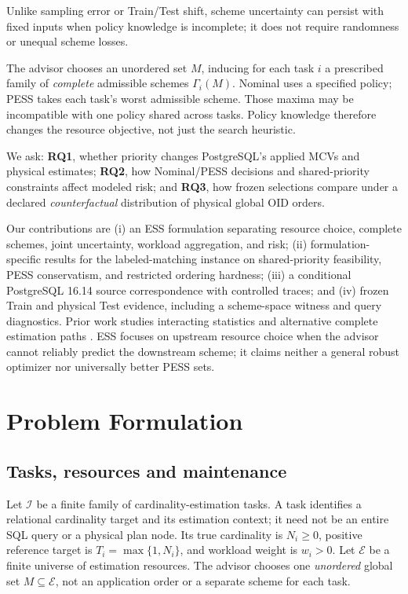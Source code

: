 \documentclass[sigconf, nonacm]{acmart}
\newcommand{\E}{\mathcal E}
\newcommand{\Tasks}{\mathcal I}
\begin{document}
Unlike sampling error or Train/Test shift, scheme uncertainty can
persist with fixed inputs when policy knowledge is incomplete; it
does not require randomness or unequal scheme losses.

The advisor chooses an unordered set \(M\), inducing for each task
\(i\) a prescribed family of \emph{complete} admissible schemes
\(\Gamma_i(M)\). Nominal uses a specified policy; PESS takes each
task's worst admissible scheme. Those maxima may be incompatible
with one policy shared across tasks. Policy knowledge therefore
changes the resource objective, not just the search heuristic.

We ask: \textbf{RQ1}, whether priority changes PostgreSQL's applied
MCVs and physical estimates; \textbf{RQ2}, how Nominal/PESS decisions
and shared-priority constraints affect modeled risk; and
\textbf{RQ3}, how frozen selections compare under a declared
\emph{counterfactual} distribution of physical global OID orders.

Our contributions are (i) an ESS formulation separating resource
choice, complete schemes, joint uncertainty, workload aggregation,
and risk; (ii) formulation-specific results for the labeled-matching
instance on shared-priority feasibility, PESS conservatism, and
restricted ordering hardness; (iii) a conditional PostgreSQL 16.14
source correspondence with controlled traces; and (iv) frozen Train
and physical Test evidence, including a scheme-space witness and
query diagnostics.
Prior work studies interacting statistics and alternative complete
estimation paths \cite{bruno2004conditional,chen2022ceg,elhelw2009statadvisor}.
ESS focuses on upstream resource choice when the advisor cannot
reliably predict the downstream scheme; it claims neither a general
robust optimizer nor universally better PESS sets.

\section{Problem Formulation}
\label{sec:model}

\subsection{Tasks, resources and maintenance}
Let \(\Tasks\) be a finite family of cardinality-estimation tasks.
A task identifies a relational cardinality target and its estimation
context; it need not be an entire SQL query or a physical plan node.
Its true cardinality is \(N_i\geq 0\), positive reference target is
\(T_i=\max\{1,N_i\}\), and workload weight is \(w_i>0\).
Let \(\E\) be a finite universe of estimation resources. The advisor
chooses one \emph{unordered} global set \(M\subseteq\E\), not an
application order or a separate scheme for each task.
\end{document}
